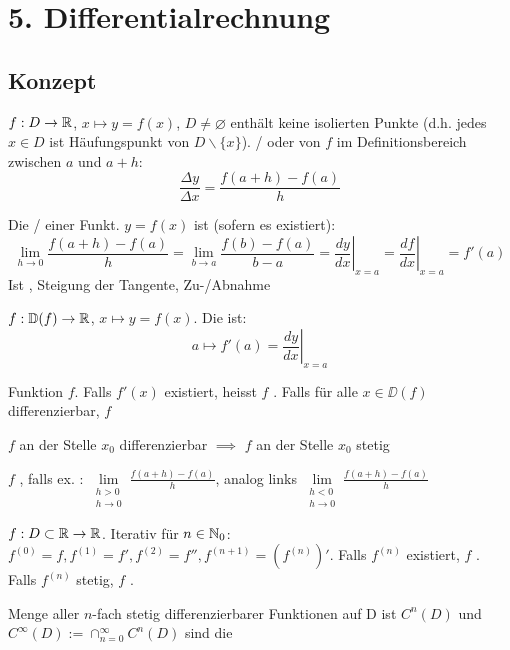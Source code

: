 \section{5. Differentialrechnung}

\subsection{Konzept}

\Def $f: D \to \mathbb{R}$, $x \mapsto y = f(x)$, $D \neq \varnothing$ enthält keine
isolierten Punkte (d.h. jedes $x \in D$ ist Häufungspunkt von $D \backslash \{x\}$).
/ oder 
von $f$ im Definitionsbereich zwischen $a$ und $a+h$:
$$\frac{\Delta y}{\Delta x} = \frac{f(a+h) - f(a)}{h}$$

\Def Die / einer Funkt. $y = f(x)$ 
ist (sofern es existiert):
$$\lim\limits_{h\to 0} \frac{f(a+h)-f(a)}{h} = \lim\limits_{b\to a}\frac{f(b) - f(a)}{b - a} = \left.\frac{dy}{dx}\right|_{x=a} = \left.\frac{df}{dx}\right|_{x=a} = f'(a)$$
Ist , Steigung der Tangente,  Zu-/Abnahme

\Def $f: \mathbb{D}(f) \to \mathbb{R}$, $x \mapsto y = f(x)$. Die  ist:
$$a \mapsto f'(a) = \left. \frac{dy}{dx} \right|_{x=a}$$

\Def Funktion $f$. Falls $f'(x)$ existiert, heisst $f$ .
Falls für alle $x \in \DD(f)$ differenzierbar, $f$ 

\Satz $f$ an der Stelle $x_0$ differenzierbar $\implies$ $f$ an der Stelle $x_0$ stetig

\Def $f$ , falls ex. :
$\lim\limits_{\substack{h > 0 \\ h \to 0}}\frac{f(a+h) - f(a)}{h}$, analog links
$\lim\limits_{\substack{h < 0 \\ h \to 0}}\frac{f(a+h) - f(a)}{h}$

\Def $f: D \subset \mathbb{R} \to \mathbb{R}$. Iterativ  für $n \in \mathbb{N}_0$:
$f^{(0)} = f, f^{(1)} = f', f^{(2)} = f'', f^{(n+1)} = (f^{(n)})'$.
Falls $f^{(n)}$ existiert, $f$ . Falls $f^{(n)}$ stetig,
$f$ .

\Def Menge aller $n$-fach stetig differenzierbarer Funktionen auf D ist $C^n(D)$ und
$C^\infty(D) := \cap_{n=0}^\infty C^n(D)$ sind die 

